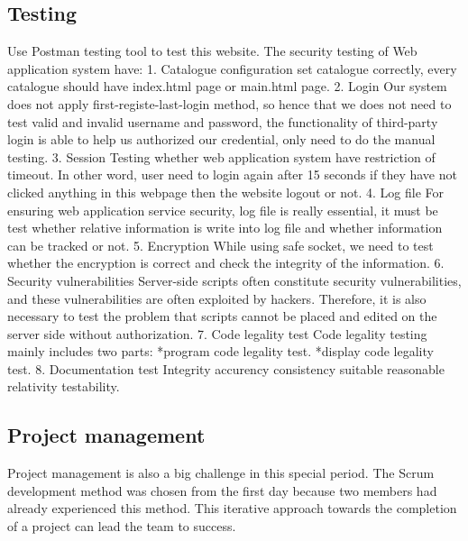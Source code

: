 \documentclass[conference]{IEEEtran}
\begin{document}
\subsection{Testing}
Use Postman testing tool to test this website. The security testing of Web application system have:
1. Catalogue configuration
set catalogue correctly, every catalogue should have index.html page or main.html page.
2. Login
Our system does not apply first-registe-last-login method, so hence that we does not need to test
valid and invalid username and password, the functionality of third-party login is able to help
us authorized our credential, only need to do the manual testing.
3. Session
Testing whether web application system have restriction of timeout. In other word, user need to
login again after 15 seconds if they have not clicked anything in this webpage then the website
logout or not.
4. Log file
For ensuring web application service security, log file is really essential, it must be test whether
relative information is write into log file and whether information can be tracked or not.
5. Encryption
While using safe socket, we need to test whether the encryption is correct and check the integrity
of the information.
6. Security vulnerabilities
Server-side scripts often constitute security vulnerabilities, and these vulnerabilities are often exploited by hackers.
Therefore, it is also necessary to test the problem that scripts cannot be placed and edited on the server side without authorization.
7. Code legality test
Code legality testing mainly includes two parts:
*program code legality test.
*display code legality test.
8. Documentation test
Integrity accurency consistency suitable reasonable relativity testability.

\subsection{Project management}

Project management is also a big challenge in this special period. The Scrum development method was chosen from the first day because two members
had already experienced this method. This iterative approach towards the completion of a project can lead the team to success.
\end{document}
